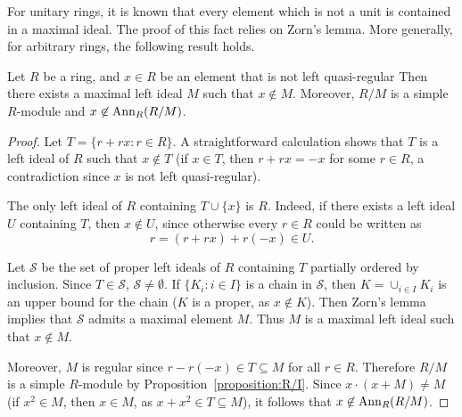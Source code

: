 
For unitary rings, it is known that every element which is not a unit is contained in a maximal ideal. The proof of this fact relies on Zorn's lemma. More generally, for arbitrary rings, the following result holds.

\begin{lemma}
	\label{lemma:maxreg}
	Let $R$ be a ring, and $x\in R$ be an element that is not left quasi-regular Then there
	exists a maximal left ideal $M$ such that 
	$x\not\in M$. Moreover, $R/M$ is a simple $R$-module and 
	$x\not\in\operatorname{Ann}_R(R/M)$.
\end{lemma}

\begin{proof}
	Let $T=\{r+rx:r\in R\}$. A straightforward calculation shows that $T$ is a left ideal of 
	$R$ such that $x\not\in T$ (if $x\in T$, then $r+rx=-x$ for some 
	$r\in R$, a contradiction since $x$ is not left quasi-regular). 

	The only left ideal of $R$ containing 
	$T\cup\{x\}$ is $R$. Indeed, if there exists a left ideal $U$ containing $T$, then 
    $x\not\in U$, since otherwise every $r\in R$ could be written as 
	\[
    r=(r+rx)+r(-x)\in U.
    \]

	Let $\mathcal{S}$ be the set of proper left ideals of $R$ containing 
	$T$ partially ordered by inclusion. Since $T\in\mathcal{S}$, $\mathcal{S}\ne\emptyset$. 
    If $\{K_i:i\in I\}$ is a chain in 
	$\mathcal{S}$, then $K=\cup_{i\in I}K_i$ is an upper bound for the chain 
	($K$ is a proper, as $x\not\in K$). Then Zorn's lemma implies that 
	$\mathcal{S}$ admits a maximal element $M$. Thus $M$
	is a maximal left ideal such that $x\not\in M$.
 
        Moreover, $M$ is regular
	since $r-r(-x)\in T\subseteq M$ for all $r\in R$. Therefore $R/M$ is a simple 
	$R$-module by Proposition~\ref{proposition:R/I}. Since $x\cdot (x+M)\ne
	M$ (if $x^2\in M$, then  $x\in M$, as $x+x^2\in
	T\subseteq M$), it follows that $x\not\in\operatorname{Ann}_R(R/M)$.
\end{proof}

